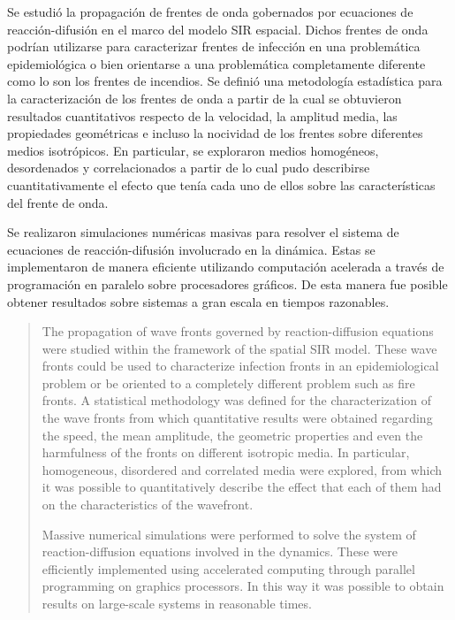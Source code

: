 \begin{resumen}
    Se estudió la propagación de frentes de onda gobernados por ecuaciones de reacción-difusión en el marco del modelo SIR espacial.
    Dichos frentes de onda podrían utilizarse para caracterizar frentes de infección en una problemática epidemiológica o bien orientarse a una problemática completamente
    diferente como lo son los frentes de incendios. Se definió una metodología estadística para la caracterización de los frentes de onda a partir de la cual se obtuvieron
    resultados cuantitativos respecto de la velocidad, la amplitud media, las propiedades geométricas e incluso la nocividad de los frentes sobre diferentes medios
    isotrópicos. En particular, se exploraron medios homogéneos, desordenados y correlacionados a partir de lo cual pudo describirse cuantitativamente el efecto que tenía
    cada uno de ellos sobre las características del frente de onda.
     
    Se realizaron simulaciones numéricas masivas para resolver el sistema de ecuaciones de reacción-difusión involucrado en la dinámica. Estas se implementaron
    de manera eficiente utilizando computación acelerada a través de programación en paralelo sobre procesadores gráficos. De esta manera fue posible obtener resultados
    sobre sistemas a gran escala en tiempos razonables.
\end{resumen}

\begin{abstract}
    The propagation of wave fronts governed by reaction-diffusion equations were studied within the framework of the spatial SIR model.
    These wave fronts could be used to characterize infection fronts in an epidemiological problem or be oriented to a completely different problem such as fire fronts.
    A statistical methodology was defined for the characterization of the wave fronts from which quantitative results were obtained regarding the speed, the mean 
    amplitude, the geometric properties and even the harmfulness of the fronts on different isotropic media. In particular, homogeneous, disordered and correlated 
    media were explored, from which it was possible to quantitatively describe the effect that each of them had on the characteristics of the wavefront.
    
    Massive numerical simulations were performed to solve the system of reaction-diffusion equations involved in the dynamics. These were efficiently implemented using 
    accelerated computing through parallel programming on graphics processors. In this way it was possible to obtain results on large-scale systems in reasonable times.    
\end{abstract}
